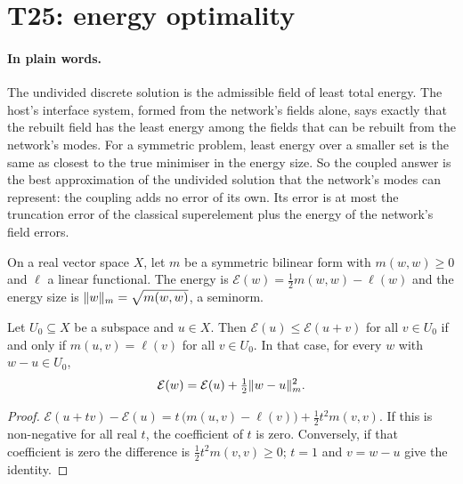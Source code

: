 \section{T25: energy optimality}

\paragraph{In plain words.}
The undivided discrete solution is the admissible field of least total energy.
The host's interface system, formed from the network's fields alone, says
exactly that the rebuilt field has the least energy among the fields that can
be rebuilt from the network's modes.  For a symmetric problem, least energy
over a smaller set is the same as closest to the true minimiser in the energy
size.  So the coupled answer is the best approximation of the undivided
solution that the network's modes can represent: the coupling adds no error of
its own.  Its error is at most the truncation error of the classical
superelement plus the energy of the network's field errors.

\begin{definition}\label{def:quad}
  \leanok
  On a real vector space $X$, let $m$ be a symmetric bilinear form with
  $m(w,w)\ge0$ and $\ell$ a linear functional.  The energy is
  $\mathcal E(w)=\tfrac12m(w,w)-\ell(w)$ and the energy size is
  $\lVert w\rVert_m=\sqrt{m(w,w)}$, a seminorm.
\end{definition}

\begin{lemma}\label{lem:stationary}
  \leanok
  Let $U_0\subseteq X$ be a subspace and $u\in X$.  Then
  $\mathcal E(u)\le\mathcal E(u+v)$ for all $v\in U_0$ if and only if
  $m(u,v)=\ell(v)$ for all $v\in U_0$.  In that case, for every $w$ with
  $w-u\in U_0$,
  \[
    \mathcal E(w)=\mathcal E(u)+\tfrac12\lVert w-u\rVert_m^2 .
  \]
\end{lemma}

\begin{proof}
  \leanok
  $\mathcal E(u+tv)-\mathcal E(u)=t\,\bigl(m(u,v)-\ell(v)\bigr)+\tfrac12t^2m(v,v)$.
  If this is non-negative for all real $t$, the coefficient of $t$ is zero.
  Conversely, if that coefficient is zero the difference is
  $\tfrac12t^2m(v,v)\ge0$; $t=1$ and $v=w-u$ give the identity.
\end{proof}


